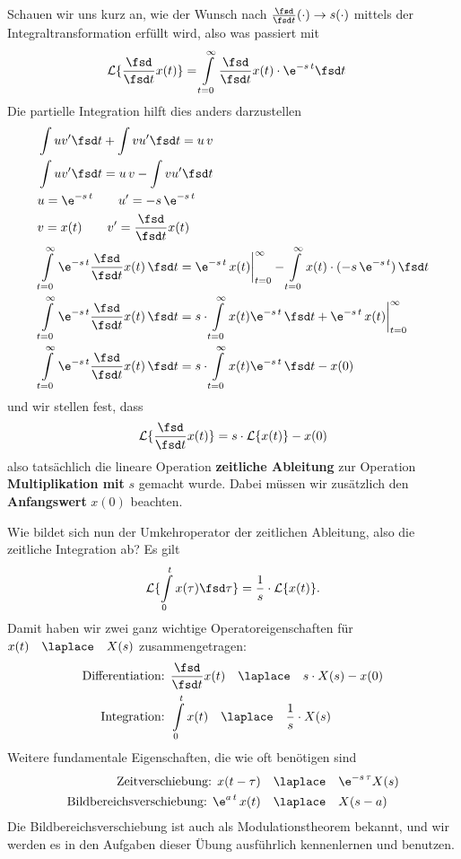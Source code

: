 Schauen wir uns kurz an, wie der Wunsch nach
$\frac{\fsd }{\fsd t} (\cdot) \rightarrow s(\cdot )$
mittels der Integraltransformation erfüllt wird, also was passiert mit
\begin{align}
\mathcal{L}\{\frac{\fsd }{\fsd t}  x(t)\} &= \int\limits_{t=0}^{\infty} \frac{\fsd }{\fsd t}  x(t) \cdot \e^{-s\,t} \fsd t
\end{align}
Die partielle Integration hilft dies anders darzustellen
\begin{align}
&\int u v' \fsd t + \int v u' \fsd t = u\,v\\
&\int u v' \fsd t = u\,v - \int v u' \fsd t\\
&u = \e^{-s\,t}\qquad u' = -s\,\e^{-s\,t}\\
&v = x(t)\qquad v' = \frac{\fsd }{\fsd t}  x(t)\\
&\int\limits_{t=0}^{\infty} \e^{-s\,t} \frac{\fsd }{\fsd t}  x(t) \, \fsd t
= \e^{-s\,t}\,x(t)\bigg|_{t=0}^{\infty} - \int\limits_{t=0}^{\infty} x(t) \cdot (-s\,\e^{-s\,t}) \, \fsd t\\
&\int\limits_{t=0}^{\infty} \e^{-s\,t} \frac{\fsd }{\fsd t}  x(t) \, \fsd t
= s \cdot \int\limits_{t=0}^{\infty} x(t) \e^{-s\,t} \, \fsd t
+\e^{-s\,t}\,x(t)\bigg|_{t=0}^{\infty}\\
&\int\limits_{t=0}^{\infty} \e^{-s\,t} \frac{\fsd }{\fsd t}  x(t) \, \fsd t
= s \cdot \int\limits_{t=0}^{\infty} x(t) \e^{-s\,t} \, \fsd t - x(0)
\end{align}
und wir stellen fest, dass
\begin{align}
\mathcal{L}\{\frac{\fsd }{\fsd t}  x(t)\}  = s \cdot \mathcal{L}\{x(t)\} - x(0)
\end{align}
also tatsächlich die lineare Operation \textbf{zeitliche Ableitung} zur Operation
\textbf{Multiplikation mit} $s$ gemacht wurde. Dabei müssen wir zusätzlich den
\textbf{Anfangswert} $x(0)$ beachten.

Wie bildet sich nun der Umkehroperator der zeitlichen Ableitung, also die zeitliche
Integration ab? Es gilt
\begin{align}
\mathcal{L}\{\int\limits_{0}^{t} x(\tau)\fsd \tau\}  = \frac{1}{s} \cdot \mathcal{L}\{x(t)\}.
\end{align}
Damit haben wir zwei ganz wichtige Operatoreigenschaften für
$x(t)\quad\laplace\quad X(s)$ zusammengetragen:
\begin{align}
\text{Differentiation:   } &\frac{\fsd }{\fsd t}  x(t) \quad\laplace\quad s\cdot X(s) - x(0)\\
\text{Integration:   } &\int\limits_{0}^{t} x(t) \quad\laplace\quad \frac{1}{s} \cdot X(s)
\end{align}
%
Weitere fundamentale Eigenschaften, die wie oft benötigen sind
\begin{align}
\text{Zeitverschiebung:   } x(t-\tau)& \quad\laplace\quad \e^{-s\,\tau} X(s)\\
\text{Bildbereichsverschiebung:   } \e^{a\,t} \, x(t)& \quad\laplace\quad X(s-a)
\end{align}
Die Bildbereichsverschiebung ist auch als Modulationstheorem bekannt,
und wir werden es in den Aufgaben dieser Übung ausführlich kennenlernen und
benutzen.


